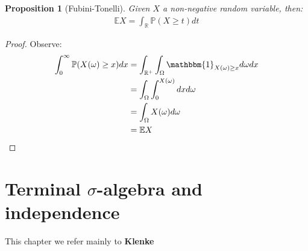 \documentclass[a4paper,11pt]{book}
\newtheorem{proposition}[theorem]{Proposition}
\theoremstyle{definition}
\theoremstyle{remark}
\begin{document}
\begin{proposition}[Fubini-Tonelli]
	Given $X$ a non-negative random variable, then:
	\begin{align*}
		\mathbb{E} X = \int_{\mathbb{R}} \mathbb{P}(X \geq t) dt
	\end{align*}
\end{proposition}
\begin{proof}
Observe:
	\begin{align*}
		\int_0^\infty \mathbb{P}(X(\omega) \geq x) dx &= \int_{\mathbb{R}^+} \int_\Omega \mathbbm{1}_{X(\omega) \geq x}d\omega dx\\
		&= \int_\Omega \int_0^{X(\omega)} dx d\omega \\
		&= \int_\Omega X(\omega) d\omega \\
	 	&= \mathbb{E} X
	\end{align*}
\end{proof}


\section{Terminal $\sigma$-algebra and independence}
This chapter we refer mainly to \textbf{Klenke}
\end{document}
